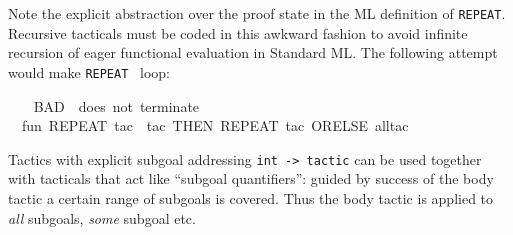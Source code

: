 \begin{isabellebody}
\begin{isamarkuptext}
  \begin{warn}
  Note the explicit abstraction over the proof state in the ML
  definition of \verb|REPEAT|.  Recursive tacticals must be coded in
  this awkward fashion to avoid infinite recursion of eager functional
  evaluation in Standard ML.  The following attempt would make \verb|REPEAT|~ loop:
  \end{warn}%
\end{isamarkuptext}%
\isamarkuptrue%
%
\isadelimML
%
\endisadelimML
%
\isatagML
{}\isamarkupfalse%
\ {}\isanewline
\ \ {}{}BAD\ {}{}\ does\ not\ terminate{}{}{}\isanewline
\ \ fun\ REPEAT\ tac\ {}\ {}tac\ THEN\ REPEAT\ tac{}\ ORELSE\ all{}tac{}\isanewline
{}%
\endisatagML
{\isafoldML}%
%
\isadelimML
%
\endisadelimML
%
\isamarkuptrue%
%
\begin{isamarkuptext}%
Tactics with explicit subgoal addressing
  \verb|int -> tactic| can be used together with tacticals that
  act like ``subgoal quantifiers'': guided by success of the body
  tactic a certain range of subgoals is covered.  Thus the body tactic
  is applied to \emph{all} subgoals, \emph{some} subgoal etc.


\end{isamarkuptext}
\end{isabellebody}
